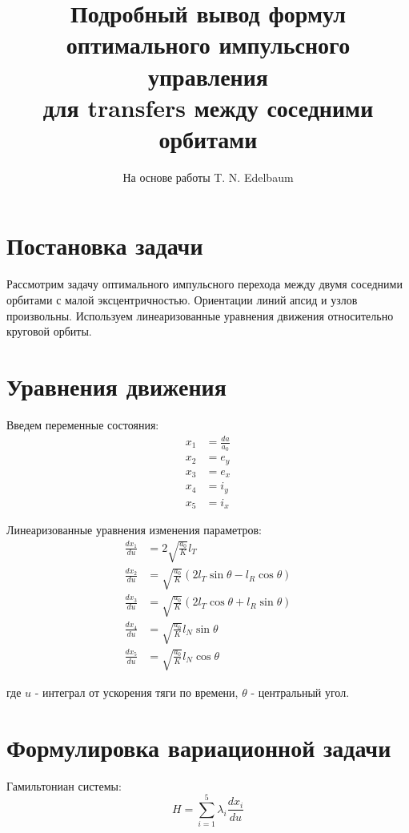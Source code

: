 \documentclass[12pt]{article}
\title{Подробный вывод формул оптимального импульсного управления \\ для transfers между соседними орбитами}
\author{На основе работы T. N. Edelbaum}
\date{}
\begin{document}
\maketitle

\section{Постановка задачи}

Рассмотрим задачу оптимального импульсного перехода между двумя соседними орбитами с малой эксцентричностью. Ориентации линий апсид и узлов произвольны. Используем линеаризованные уравнения движения относительно круговой орбиты.

\section{Уравнения движения}

Введем переменные состояния:
\begin{align*}
x_1 &= \frac{da}{a_0} \\
x_2 &= e_y \\
x_3 &= e_x \\
x_4 &= i_y \\
x_5 &= i_x
\end{align*}

Линеаризованные уравнения изменения параметров:
\begin{align}
\frac{dx_1}{du} &= 2\sqrt{\frac{a_0}{K}}l_T \tag{1} \\
\frac{dx_2}{du} &= \sqrt{\frac{a_0}{K}}(2l_T\sin\theta - l_R\cos\theta) \tag{2} \\
\frac{dx_3}{du} &= \sqrt{\frac{a_0}{K}}(2l_T\cos\theta + l_R\sin\theta) \tag{3} \\
\frac{dx_4}{du} &= \sqrt{\frac{a_0}{K}}l_N\sin\theta \tag{4} \\
\frac{dx_5}{du} &= \sqrt{\frac{a_0}{K}}l_N\cos\theta \tag{5}
\end{align}

где $u$ - интеграл от ускорения тяги по времени, $\theta$ - центральный угол.

\section{Формулировка вариационной задачи}

Гамильтониан системы:
\begin{equation}
H = \sum_{i=1}^5 \lambda_i \frac{dx_i}{du} \tag{6}
\end{equation}
\end{document}

